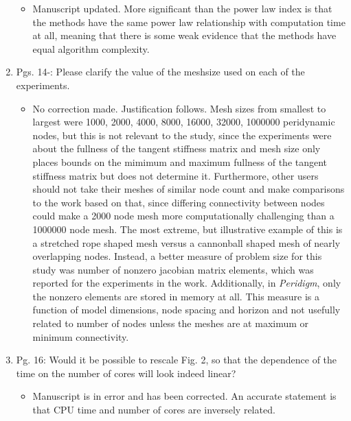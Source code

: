 \documentclass{article}
\begin{document}
\begin{enumerate}
{\color{red}  
\begin{itemize}
     \item
      Manuscript updated. More significant than the power law index is that the methods have the same power law relationship with computation time at all, meaning that there is some weak evidence that the methods have equal algorithm complexity. 
  \end{itemize}}

  \item
    Pgs. 14-: Please clarify the value of the meshsize used on each of the experiments.

{\color{red}  
\begin{itemize}
     \item
         No correction made. Justification follows.
         Mesh sizes from smallest to largest were 1000, 2000, 4000, 8000,
         16000, 32000, 1000000 peridynamic nodes, but this is not relevant to
         the study, since the experiments were about the fullness of the
         tangent stiffness matrix and mesh size only places bounds on the
         mimimum and maximum fullness of the tangent stiffness matrix but does
         not determine it.  Furthermore, other users should not take their
         meshes of similar node count and make comparisons to the work based on that, since
         differing connectivity between nodes could make a 2000 node mesh more
         computationally challenging than a 1000000 node mesh.
         The most extreme, but illustrative example of this is a stretched rope shaped mesh versus a cannonball shaped mesh of nearly overlapping nodes.
         Instead, a better measure of problem size for this study was number of nonzero jacobian matrix elements, which was reported for the experiments in the work. Additionally, in \emph{Peridigm}, only the nonzero elements are stored in memory at all. This measure is a function of model dimensions, node spacing and horizon and not usefully related to number of nodes unless the meshes are at maximum or minimum connectivity.
      \end{itemize}}

  \item
    Pg. 16: Would it be possible to rescale Fig. 2, so that the dependence of the time
    on the number of cores will look indeed linear?

{\color{red}  
\begin{itemize}
     \item
     Manuscript is in error and has been corrected. An accurate statement is that CPU time and number of cores are inversely related.
  \end{itemize}}


\end{enumerate}
\end{document}
